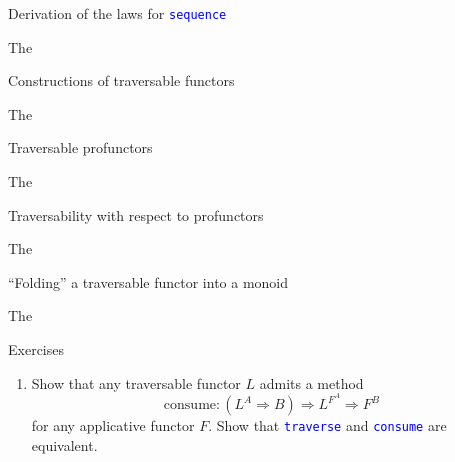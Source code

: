 \documentclass[english]{beamer}
\begin{document}
\begin{frame}{Derivation of the laws for \texttt{\textcolor{blue}{\footnotesize{}sequence}} }

\vspace{-0.15cm}The
\end{frame}

\begin{frame}{Constructions of traversable functors}

\vspace{-0.15cm}The 
\end{frame}

\begin{frame}{Traversable profunctors}

\vspace{-0.15cm}The
\end{frame}

\begin{frame}{Traversability with respect to profunctors}

\vspace{-0.15cm}The
\end{frame}

\begin{frame}{``Folding'' a traversable functor into a monoid}

\vspace{-0.15cm}The 
\end{frame}

\begin{frame}{Exercises}
\begin{enumerate}
\item {\footnotesize{}\vspace{-0.15cm}Show that any traversable functor
$L$ admits a method 
\[
\text{consume}:(L^{A}\Rightarrow B)\Rightarrow L^{F^{A}}\Rightarrow F^{B}
\]
for any applicative functor $F$. Show that }\texttt{\textcolor{blue}{\footnotesize{}traverse}}{\footnotesize{}
and }\texttt{\textcolor{blue}{\footnotesize{}consume}}{\footnotesize{}
are equivalent.}{\footnotesize \par}
\end{enumerate}
\end{frame}
\end{document}
